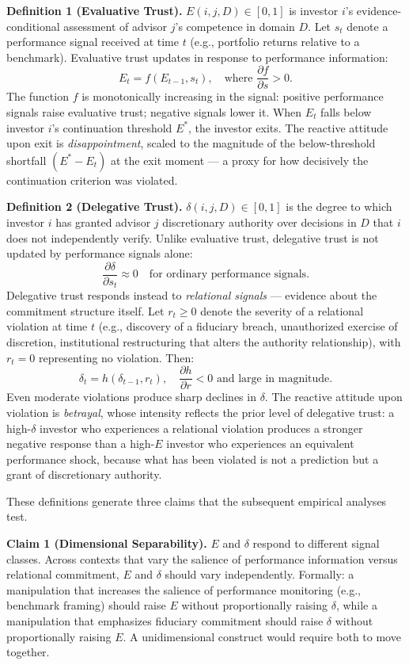 \textbf{Definition 1 (Evaluative Trust).} $E(i, j, D) \in [0, 1]$ is investor $i$'s evidence-conditional assessment of advisor $j$'s competence in domain $D$. Let $s_t$ denote a performance signal received at time $t$ (e.g., portfolio returns relative to a benchmark). Evaluative trust updates in response to performance information:
\[
E_t = f(E_{t-1}, s_t), \quad \text{where } \frac{\partial f}{\partial s} > 0.
\]
The function $f$ is monotonically increasing in the signal: positive performance signals raise evaluative trust; negative signals lower it. When $E_t$ falls below investor $i$'s continuation threshold $E^*$, the investor exits. The reactive attitude upon exit is \textit{disappointment}, scaled to the magnitude of the below-threshold shortfall $(E^* - E_t)$ at the exit moment --- a proxy for how decisively the continuation criterion was violated.

\textbf{Definition 2 (Delegative Trust).} $\delta(i, j, D) \in [0, 1]$ is the degree to which investor $i$ has granted advisor $j$ discretionary authority over decisions in $D$ that $i$ does not independently verify. Unlike evaluative trust, delegative trust is not updated by performance signals alone:
\[
\frac{\partial \delta}{\partial s_t} \approx 0 \quad \text{for ordinary performance signals.}
\]
Delegative trust responds instead to \textit{relational signals} --- evidence about the commitment structure itself. Let $r_t \geq 0$ denote the severity of a relational violation at time $t$ (e.g., discovery of a fiduciary breach, unauthorized exercise of discretion, institutional restructuring that alters the authority relationship), with $r_t = 0$ representing no violation. Then:
\[
\delta_t = h(\delta_{t-1}, r_t), \quad \frac{\partial h}{\partial r} < 0 \text{ and large in magnitude.}
\]
Even moderate violations produce sharp declines in $\delta$.
The reactive attitude upon violation is \textit{betrayal}, whose intensity reflects the prior level of delegative trust: a high-$\delta$ investor who experiences a relational violation produces a stronger negative response than a high-$E$ investor who experiences an equivalent performance shock, because what has been violated is not a prediction but a grant of discretionary authority.

These definitions generate three claims that the subsequent empirical analyses test.

\textbf{Claim 1 (Dimensional Separability).} $E$ and $\delta$ respond to different signal classes. Across contexts that vary the salience of performance information versus relational commitment, $E$ and $\delta$ should vary independently. Formally: a manipulation that increases the salience of performance monitoring (e.g., benchmark framing) should raise $E$ without proportionally raising $\delta$, while a manipulation that emphasizes fiduciary commitment should raise $\delta$ without proportionally raising $E$. A unidimensional construct would require both to move together.

